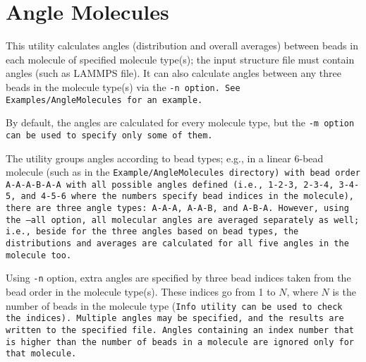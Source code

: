 \section{Angle Molecules} \label{sec:AngleMolecules}

This utility calculates angles (distribution and overall averages) between beads
in each molecule of specified molecule type(s); the input structure file must
contain angles (such as LAMMPS \data file). It can also calculate angles between
any three beads in the molecule type(s) via the \tt{-n} option. See
\tt{Examples/AngleMolecules} for an example.

By default, the angles are calculated for every molecule type, but the \tt{-m}
option can be used to specify only some of them.

The utility groups angles according to bead types; e.g., in a linear 6-bead
molecule (such as in the \tt{Example/AngleMolecules} directory) with bead order
A-A-A-B-A-A with all possible angles defined (i.e., 1-2-3, 2-3-4, 3-4-5, and
4-5-6 where the numbers specify bead indices in the molecule), there are three
angle types: A-A-A, A-A-B, and A-B-A. However, using the \tt{--all} option, all
molecular angles are averaged separately as well; i.e., beside for the three
angles based on bead types, the distributions and averages are calculated for
all five angles in the molecule too.

Using \texttt{-n} option, extra angles are specified by three bead indices taken
from the bead order in the molecule type(s). These indices go from 1 to $N$,
where $N$ is the number of beads in the molecule type (\tt{Info} utility can be
used to check the indices). Multiple angles may be specified, and the results
are written to the specified file. Angles containing an index number that is
higher than the number of beads in a molecule are ignored only for that
molecule.

